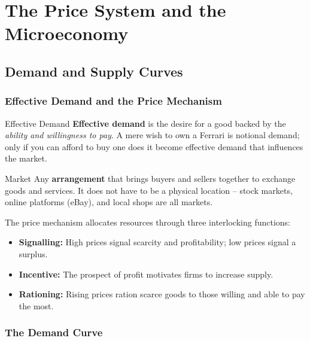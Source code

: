 \documentclass[11pt, a4paper, twoside]{book}
\begin{document}
\chapter{The Price System and the Microeconomy}

\section{Demand and Supply Curves}



\subsection{Effective Demand and the Price Mechanism}

\begin{keyterm}{Effective Demand}
\textbf{Effective demand} is the desire for a good backed by the \emph{ability and willingness to pay}. A mere wish to own a Ferrari is notional demand; only if you can afford to buy one does it become effective demand that influences the market.
\end{keyterm}

\begin{keyterm}{Market}
Any \textbf{arrangement} that brings buyers and sellers together to exchange goods and services. It does not have to be a physical location -- stock markets, online platforms (eBay), and local shops are all markets.
\end{keyterm}

The price mechanism allocates resources through three interlocking functions:
\begin{itemize}
  \item \textbf{Signalling:} High prices signal scarcity and profitability; low prices signal a surplus.
  \item \textbf{Incentive:} The prospect of profit motivates firms to increase supply.
  \item \textbf{Rationing:} Rising prices ration scarce goods to those willing and able to pay the most.
\end{itemize}

\subsection{The Demand Curve}
\end{document}
